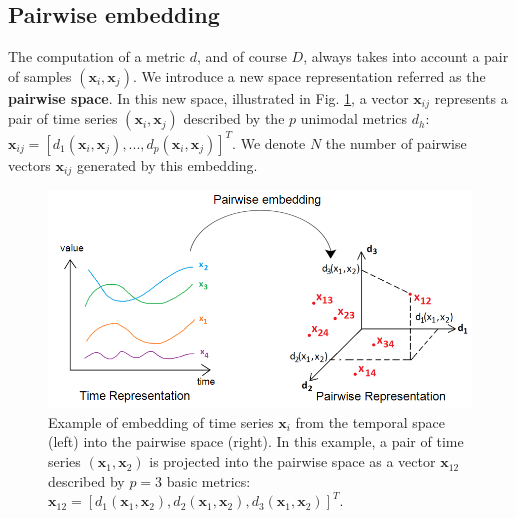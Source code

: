 \subsection{Pairwise embedding}
\label{sec:Pairwise_embedding}
The computation of a metric $d$, and of course $D$, always takes into account a pair of samples $(\textbf{x}_i,\textbf{x}_j)$. We introduce a new space representation referred as the \textbf{pairwise space}. In this new space, illustrated in Fig. \ref{fig:PairwiseEmbedding}, a vector $\textbf{x}_{ij}$ represents a pair of time series $(\textbf{x}_i,\textbf{x}_j)$ described by the $p$ unimodal metrics $d_h$: $\textbf{x}_{ij}=[d_1(\textbf{x}_i,\textbf{x}_j), ..., d_p(\textbf{x}_i,\textbf{x}_j)]^T$. We denote $N$ the number of pairwise vectors $\textbf{x}_{ij}$ generated by this embedding.


\begin{figure}[h!]
	\begin{minipage}[b]{1.0\linewidth}
		\centering
		\includegraphics[width=0.9\linewidth]{images/PairwiseEmbedding}
	\end{minipage}
	\caption{Example of embedding of time series $\textbf{x}_i$ from the temporal space (left) into the pairwise space (right). In this example, a pair of time series $(\textbf{x}_1, \textbf{x}_2)$ is projected into the pairwise space as a vector $\textbf{x}_{12}$ described by $p=3$ basic metrics: $\textbf{x}_{12} = [d_1(\textbf{x}_1, \textbf{x}_2), d_2(\textbf{x}_1, \textbf{x}_2), d_3(\textbf{x}_1, \textbf{x}_2)]^T$.}
	\label{fig:PairwiseEmbedding}
\end{figure}

